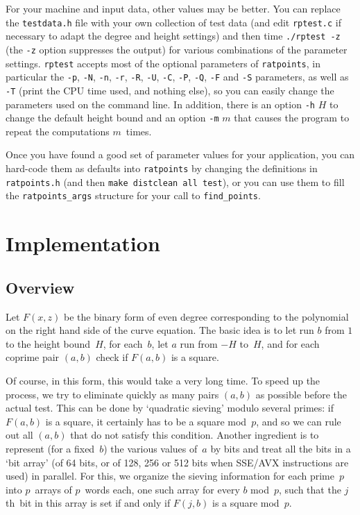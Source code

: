 \documentclass[12pt,a4paper,oneside]{amsart}
\begin{document}
For your machine
and input data, other values may be better. You can replace the
\texttt{testdata.h} file with your own collection of test data (and
edit \texttt{rptest.c} if necessary to adapt the degree and height settings)
and then time \texttt{./rptest -z} (the \verb+-z+ option suppresses the output)
for various combinations of the parameter settings. \texttt{rptest} accepts
most of the optional parameters of \texttt{ratpoints}, in particular
the \verb+-p+, \verb+-N+, \verb+-n+, \verb+-r+, \verb+-R+, \verb+-U+,
\verb+-C+, \verb+-P+, \verb+-Q+, \verb+-F+ and \verb+-S+ parameters, as well as \verb+-T+ (print the CPU time used, and
nothing else),
so you can easily change the parameters used on the command line. In addition,
there is an option \verb+-h+ $H$ to change the default height bound
and an option \verb+-m+ $m$ that causes the program to repeat the
computations $m$~times.

Once you have found a good set of parameter values for your application,
you can hard-code them as defaults into \texttt{ratpoints} by changing the
definitions in \texttt{ratpoints.h} (and then \texttt{make distclean all test}),
or you can use them to fill the \texttt{ratpoints\_args} structure for
your call to \texttt{find\_points}.


\section{Implementation} \label{impl}

\subsection{Overview}

Let $F(x, z)$ be the binary form of even degree corresponding to the
polynomial on the right hand side of the curve equation. The basic idea
is to let run $b$ from $1$ to the height bound~$H$, for each~$b$, let
$a$ run from $-H$ to~$H$, and for each coprime pair $(a,b)$ check
if $F(a, b)$ is a square.

Of course, in this form, this would take a very long time. To speed up the
process, we try to eliminate quickly as many pairs $(a, b)$ as possible
before the actual test. This can be done by `quadratic sieving' modulo
several primes: if $F(a, b)$ is a square, it certainly has to be a square
mod~$p$, and so we can rule out all $(a, b)$ that do not satisfy this
condition. Another ingredient is to represent (for a fixed~$b$) the
various values of~$a$ by bits and treat all the bits in a `bit array'
(of 64 bits, or of 128, 256 or 512 bits when SSE/AVX instructions are
used) in parallel. For this, we organize the sieving information for each
prime~$p$ into $p$~arrays of $p$~words each, one such array for every $b$
mod~$p$, such that the $j$th~bit in this array is set if and only if
$F(j, b)$ is a square mod~$p$.
\end{document}
